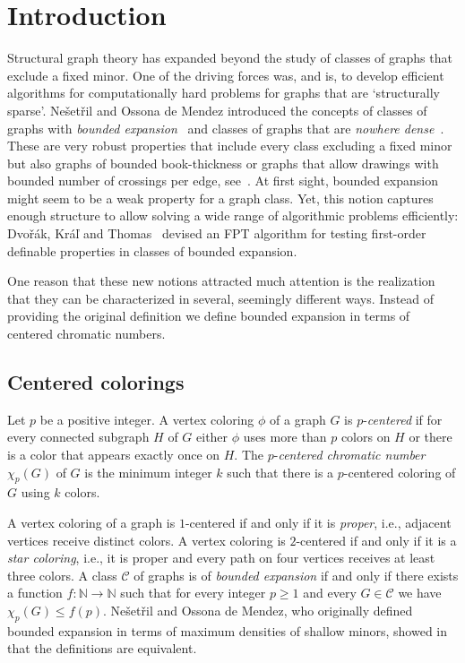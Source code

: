 \section{Introduction}
Structural graph theory has expanded beyond the study of
classes of graphs that exclude a fixed minor.
One of the driving forces was, and is, to develop efficient algorithms 
for computationally hard problems for graphs that are `structurally sparse'.
Ne{\v{s}}et{\v{r}}il and Ossona de Mendez introduced the concepts of 
classes of graphs with 
\emph{bounded expansion}~\cite{NOdM08} and 
classes of graphs that are \emph{nowhere dense}~\cite{NOdM11}.
These are very robust properties that include 
every class excluding a fixed minor but also 
graphs of bounded book-thickness or
graphs that allow drawings with bounded number of crossings per edge,
see~\cite{NOdMW12}.
At first sight, bounded expansion might seem to be a weak property for
a graph class.
Yet, this notion captures enough structure to allow solving a wide range
of algorithmic problems efficiently: 
Dvořák, Kráľ and Thomas~\cite{DKT12} devised an FPT algorithm for testing 
first-order definable properties in classes of bounded expansion.

One reason that these new notions attracted much attention 
is the realization that they can be characterized in several, 
seemingly different ways.
Instead of providing the original definition 
we define bounded expansion in terms of centered chromatic numbers.
\subsection{Centered colorings}
Let $p$ be a positive integer.
A vertex coloring $\phi$ of a graph $G$ is $p$-\emph{centered}
if for every connected subgraph $H$ of $G$ 
either $\phi$ uses more than $p$ colors on $H$ or there is a color
that appears exactly once on $H$.
The $p$-\emph{centered chromatic number} $\chi_p(G)$ of $G$ is the minimum integer $k$ 
such that there is a $p$-centered coloring of $G$ using $k$ colors.

A vertex coloring of a graph is $1$-centered if and only if 
it is \emph{proper}, i.e.,  
adjacent vertices receive distinct colors.
A vertex coloring is $2$-centered if and only if it is a \emph{star coloring}, 
i.e., it is proper and every path on four vertices receives at least three colors.
A class $\mathcal{C}$ of graphs is of \emph{bounded expansion} if and only if 
there exists a function $f:\mathbb{N}\to\mathbb{N}$ such that
for every integer $p\geq1$ and every $G\in\mathcal{C}$ we have
$\chi_p(G)\leq f(p)$. 
Ne{\v{s}}et{\v{r}}il and Ossona de
Mendez, who originally defined bounded expansion in terms of maximum densities 
of shallow minors, 
showed in~\cite{NOdM08} that the definitions are equivalent.

